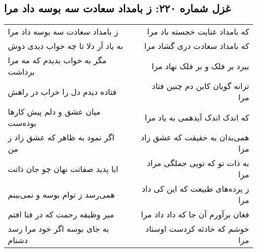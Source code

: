 \begin{center}
\section*{غزل شماره ۲۲۰: ز بامداد سعادت سه بوسه داد مرا}
\label{sec:0220}
\begin{longtable}{l p{0.5cm} r}
ز بامداد سعادت سه بوسه داد مرا
&&
که بامداد عنایت خجسته باد مرا
\\
به یاد آر دلا تا چه خواب دیدی دوش
&&
که بامداد سعادت دری گشاد مرا
\\
مگر به خواب بدیدم که مه مرا برداشت
&&
ببرد بر فلک و بر فلک نهاد مرا
\\
فتاده دیدم دل را خراب در راهش
&&
ترانه گویان کاین دم چنین فتاد مرا
\\
میان عشق و دلم پیش کارها بوده‌ست
&&
که اندک اندک آیدهمی به یاد مرا
\\
اگر نمود به ظاهر که عشق زاد ز من
&&
همی‌بدان به حقیقت که عشق زاد مرا
\\
ایا پدید صفاتت نهان چو جان ذاتت
&&
به ذات تو که تویی جملگی مراد مرا
\\
همی‌رسد ز توام بوسه و نمی‌بینم
&&
ز پرده‌های طبیعت که این کی داد مرا
\\
مبر وظیفه رحمت که در فنا افتم
&&
فغان برآورم آن جا که داد داد مرا
\\
به جای بوسه اگر خود مرا رسد دشنام
&&
خوشم که حادثه کردست اوستاد مرا
\\
\end{longtable}
\end{center}
